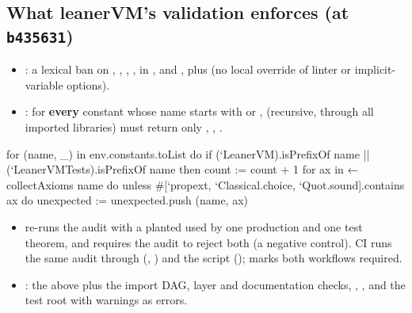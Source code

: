 \subsection{What leanerVM's validation enforces (at \texorpdfstring{\texttt{b435631}}{b435631})}\label{sec:gen-lib-lean-validation}

\begin{itemize}
\item {}\allowbreak{}: a lexical ban on , ,
  , ,  in ,  and
  , plus  (no local override of linter or
  implicit-variable options).
\item {}\allowbreak{}: for \textbf{every} constant whose name starts with
   or ,  (recursive, through all imported
  libraries) must return only , , .
\end{itemize}

\begin{leancode}
for (name, _) in env.constants.toList do
  if (`LeanerVM).isPrefixOf name || (`LeanerVMTests).isPrefixOf name then
    count := count + 1
    for ax in ← collectAxioms name do
      unless #[`propext, `Classical.choice, `Quot.sound].contains ax do
        unexpected := unexpected.push (name, ax)
\end{leancode}

\begin{itemize}
\item {}\allowbreak{} re-runs the audit with a planted
  \allowbreak{} used by one production and one test theorem, and
  requires the audit to reject both (a negative control). CI runs the same audit through
   (, \allowbreak{}\allowbreak{}) and
  the script ();  marks both workflows required.
\item {}\allowbreak{}: the above plus the import DAG, layer and documentation checks,
  , , and the test root with warnings as errors.
\end{itemize}

